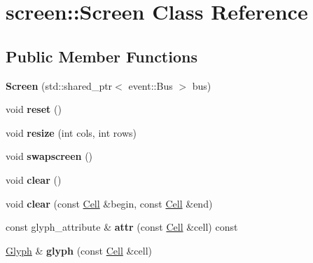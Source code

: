 \hypertarget{classscreen_1_1Screen}{}\section{screen\+::Screen Class Reference}
\label{classscreen_1_1Screen}
\subsection*{Public Member Functions}
\begin{DoxyCompactItemize}
\item 
\mbox{\label{classscreen_1_1Screen_a22fff6ab5cc0eb433285999869d95a67}} 
{\bfseries Screen} (std\+::shared\+\_\+ptr$<$ event\+::\+Bus $>$ bus)
\item 
\mbox{\label{classscreen_1_1Screen_a7cd73157621237be29e99c1a9ab355c3}} 
void {\bfseries reset} ()
\item 
\mbox{\label{classscreen_1_1Screen_adb823f6496d3fcd6b1171d053c880a3c}} 
void {\bfseries resize} (int cols, int rows)
\item 
\mbox{\label{classscreen_1_1Screen_ac70037ab168bd9154009f4c9a1863b35}} 
void {\bfseries swapscreen} ()
\item 
\mbox{\label{classscreen_1_1Screen_a42fb17a61ca5bc91badabc4c176015e8}} 
void {\bfseries clear} ()
\item 
\mbox{\label{classscreen_1_1Screen_a1f714ea5470953969efac6260225b321}} 
void {\bfseries clear} (const \mbox{\hyperlink{structCell}{Cell}} \&begin, const \mbox{\hyperlink{structCell}{Cell}} \&end)
\item 
\mbox{\label{classscreen_1_1Screen_ab323d018b399f24c1670c3b9212d5a55}} 
const glyph\+\_\+attribute \& {\bfseries attr} (const \mbox{\hyperlink{structCell}{Cell}} \&cell) const
\item 
\mbox{\label{classscreen_1_1Screen_aae6b7dddece2b0cc2c34d9947a1dc475}} 
\mbox{\hyperlink{structscreen_1_1Glyph}{Glyph}} \& {\bfseries glyph} (const \mbox{\hyperlink{structCell}{Cell}} \&cell)

\end{DoxyCompactItemize}
